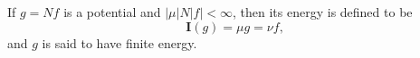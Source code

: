 If $g = Nf$ is a potential and $|\mu| N |f| < \infty$, then its energy is defined to be
$$\mathbf{I}(g) = \mu g = \nu f,$$
and $g$ is said to have finite energy.
